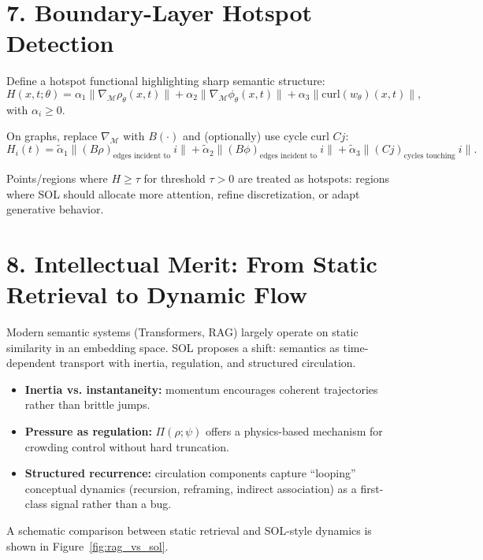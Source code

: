 \documentclass[11pt]{article}
\begin{document}
\section*{7. Boundary-Layer Hotspot Detection}

Define a hotspot functional highlighting sharp semantic structure:
\begin{equation}
H(x,t;\theta)
=
\alpha_1\|\nabla_{\mathcal{M}}\rho_\theta(x,t)\|
+\alpha_2\|\nabla_{\mathcal{M}}\phi_\theta(x,t)\|
+\alpha_3\|\mathrm{curl}(w_\theta)(x,t)\|,
\end{equation}
with $\alpha_i\ge 0$.

On graphs, replace $\nabla_{\mathcal{M}}$ with $B(\cdot)$ and (optionally) use cycle curl $Cj$:
\begin{equation}
H_i(t)
=
\tilde{\alpha}_1 \big\|(B\rho)_\text{edges incident to }i\big\|
+\tilde{\alpha}_2 \big\|(B\phi)_\text{edges incident to }i\big\|
+\tilde{\alpha}_3 \big\| (Cj)_\text{cycles touching }i \big\|.
\end{equation}

Points/regions where $H\ge \tau$ for threshold $\tau>0$ are treated as hotspots: regions where SOL should allocate more attention,
refine discretization, or adapt generative behavior.

\section*{8. Intellectual Merit: From Static Retrieval to Dynamic Flow}

Modern semantic systems (Transformers, RAG) largely operate on static similarity in an embedding space.
SOL proposes a shift: semantics as time-dependent transport with inertia, regulation, and structured circulation.
\begin{itemize}
  \item \textbf{Inertia vs. instantaneity:} momentum encourages coherent trajectories rather than brittle jumps.
  \item \textbf{Pressure as regulation:} $\Pi(\rho;\psi)$ offers a physics-based mechanism for crowding control without hard truncation.
  \item \textbf{Structured recurrence:} circulation components capture ``looping'' conceptual dynamics (recursion, reframing, indirect association)
        as a first-class signal rather than a bug.
\end{itemize}

A schematic comparison between static retrieval and SOL-style dynamics is shown in Figure~\ref{fig:rag_vs_sol}.
\end{document}

